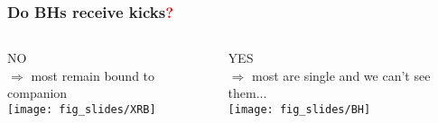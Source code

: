 \documentclass[xcolor=dvipsnames,professionalfonts, aspectratio=169]{beamer}
\begin{document}
\begin{frame}[c]
  \frametitle{Do BHs receive kicks\textcolor{red}{\bf ?}}
  \vspace*{5pt}
  \begin{columns}
    \begin{column}{0.5\textwidth}
      \centering
      {\Huge NO}\\
      {$\Rightarrow$ most remain bound to companion}\\[20pt]
      \texttt{[image: fig\_slides/XRB]}
    \end{column}
    \begin{column}{0.5\textwidth}
      \centering
      {\Huge YES}\\
      {$\Rightarrow$ most are single and we can't see them...}\\[20pt]
      \texttt{[image: fig\_slides/BH]}
  \end{column}
\end{columns}


\end{frame}
\end{document}
